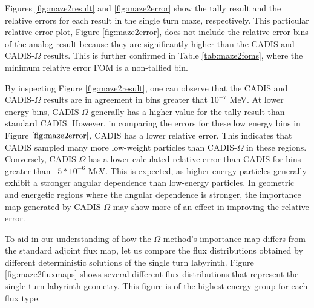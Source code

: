 Figures \ref{fig:maze2result} and \ref{fig:maze2error} show the tally result and
the relative errors for each result in the single turn maze, respectively.
This particular relative error plot,
Figure \ref{fig:maze2error}, does not include the
relative error bins of the analog result because they are significantly higher
than the CADIS and CADIS-$\Omega$ results. This is further confirmed in Table
\ref{tab:maze2foms}, where the minimum relative error FOM is a non-tallied bin.

By inspecting Figure \ref{fig:maze2result}, one can observe that the CADIS and
CADIS-$\Omega$ results are in agreement in bins greater that $10^{-7}$ MeV. At
lower energy bins, CADIS-$\Omega$ generally has a higher value for the tally
result than standard CADIS. However, in comparing the errors for these low energy
bins in Figure $\ref{fig:maze2error}$, CADIS has a lower relative error. This
indicates that CADIS sampled many more low-weight particles than CADIS-$\Omega$
in these regions. Conversely, CADIS-$\Omega$ has a lower calculated relative
error than CADIS for bins greater than ~$5*10^{-6}$ MeV. This is expected, as
higher energy particles generally exhibit a stronger angular dependence than
low-energy particles. In geometric and energetic regions
where the angular dependence is stronger,
the importance map generated by CADIS-$\Omega$ may show more of an effect in
improving the relative error.

To aid in our understanding of how the $\Omega$-method's importance map differs
from the standard adjoint flux map, let us compare the flux distributions
obtained by different deterministic solutions of the single turn labyrinth.
Figure \ref{fig:maze2fluxmaps} shows several different flux distributions that
represent the single turn labyrinth geometry. This figure is of the highest
energy group for each flux type.

